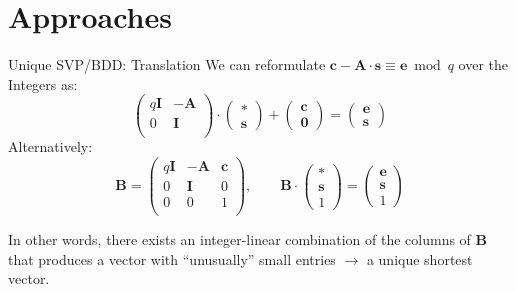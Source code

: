 \documentclass[table,10pt,aspectratio=169]{beamer}
\renewcommand{\vec}[1]{\ensuremath{\mathbf{#1}}\xspace}
\begin{document}
\section{Approaches}
\label{sec:org00f84c7}
\begin{frame}[label={sec:org6b0dc27}]{Unique SVP/BDD: Translation}
We can reformulate \(\vec{c} - \mathbf{A} \cdot \vec{s} \equiv \vec{e} \bmod q\)  over the Integers as:
\[
  \begin{pmatrix}
    q\mathbf{I} & -\mathbf{A}\\
    0 & \mathbf{I}\\
  \end{pmatrix} \cdot
  \begin{pmatrix}
    \mathbf{*}\\
    \mathbf{s}
  \end{pmatrix} +
  \begin{pmatrix}
    \vec{c}\\
    \vec{0}
  \end{pmatrix} = 
  \begin{pmatrix}
    \vec{e}\\
    \vec{s}
  \end{pmatrix}
\]
Alternatively:
\[
  \mathbf{B} = \begin{pmatrix}
    q\mathbf{I} & -\mathbf{A} & \vec{c}\\
    0 & \mathbf{I} & 0\\
    0 & 0 & 1\\
  \end{pmatrix}, \qquad
  \mathbf{B} \cdot
  \begin{pmatrix}
    \vec{*}\\
    \vec{s}\\
    1
  \end{pmatrix} = 
  \begin{pmatrix}
    \vec{e}\\
    \vec{s}\\
    1
  \end{pmatrix}
\]

In other words, there exists an integer-linear combination of the columns of \(\mathbf{B}\) that produces a vector with “unusually” small entries \(\rightarrow\) a unique shortest vector.
\end{frame}
\end{document}
